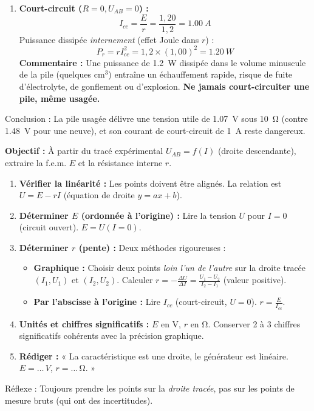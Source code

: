\documentclass[11pt]{article}
\newcommand{\cle}[1]{{\popxbold\color{popdark}#1}}
\begin{document}
\begin{exoresolu}
\begin{enumerate}
    \[ U_{AB} = E - r I = 1,20 - 1,2 \times 0,1071 \approx 1,20 - 0,1286 = \SI{1,07}{V} \]
    (Vérification : $U_{AB} = R I = 10 \times 0,1071 = \SI{1,07}{V}$).
    \item \textbf{Court-circuit ($R=0, U_{AB}=0$) :}
    \[ I_{cc} = \frac{E}{r} = \frac{1,20}{1,2} = \SI{1,00}{A} \]
    Puissance dissipée \emph{internement} (effet Joule dans $r$) :
    \[ P_{r} = r I_{cc}^2 = 1,2 \times (1,00)^2 = \SI{1,20}{W} \]
    \textbf{Commentaire :} Une puissance de \SI{1,2}{W} dissipée dans le volume minuscule de la pile (quelques cm$^3$) entraîne un échauffement rapide, risque de fuite d'électrolyte, de gonflement ou d'explosion. \textbf{Ne jamais court-circuiter une pile, même usagée.}
\end{enumerate}
\cle{Conclusion} : La pile usagée délivre une tension utile de \SI{1,07}{V} sous \SI{10}{\ohm} (contre \SI{1,48}{V} pour une neuve), et son courant de court-circuit de \SI{1}{A} reste dangereux.
\end{exoresolu}

\begin{methode}[Exploiter la caractéristique $U=f(I)$ d'un générateur pour déterminer $E$ et $r$]
\textbf{Objectif :} À partir du tracé expérimental $U_{AB} = f(I)$ (droite descendante), extraire la f.e.m. $E$ et la résistance interne $r$.
\begin{enumerate}
    \item \textbf{Vérifier la linéarité :} Les points doivent être alignés. La relation est $U = E - r I$ (équation de droite $y = ax+b$).
    \item \textbf{Déterminer $E$ (ordonnée à l'origine) :} Lire la tension $U$ pour $I=0$ (circuit ouvert). $E = U(I=0)$.
    \item \textbf{Déterminer $r$ (pente) :} Deux méthodes rigoureuses :
        \begin{itemize}
            \item \textbf{Graphique :} Choisir deux points \emph{loin l'un de l'autre} sur la droite tracée $(I_1, U_1)$ et $(I_2, U_2)$. Calculer $r = -\frac{\Delta U}{\Delta I} = \frac{U_1 - U_2}{I_2 - I_1}$ (valeur positive).
            \item \textbf{Par l'abscisse à l'origine :} Lire $I_{cc}$ (court-circuit, $U=0$). $r = \frac{E}{I_{cc}}$.
        \end{itemize}
    \item \textbf{Unités et chiffres significatifs :} $E$ en \si{V}, $r$ en \si{\ohm}. Conserver 2 à 3 chiffres significatifs cohérents avec la précision graphique.
    \item \textbf{Rédiger :} « La caractéristique est une droite, le générateur est linéaire. $E = \dots\,\si{V}$, $r = \dots\,\si{\ohm}$. »
\end{enumerate}
\cle{Réflexe} : Toujours prendre les points sur la \emph{droite tracée}, pas sur les points de mesure bruts (qui ont des incertitudes).
\end{methode}
\end{document}
